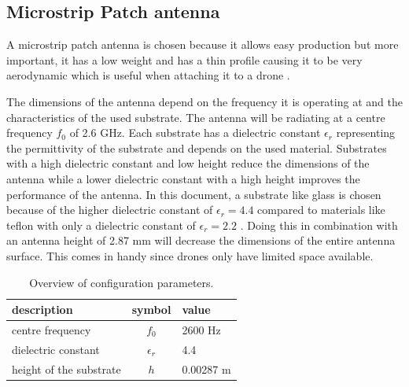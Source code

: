 \documentclass[twocolumn]{phdsymp} %
\begin{document}
\subsection{Microstrip Patch antenna}
A microstrip patch antenna is chosen because it allows easy production but more important, it has a low weight 
and has a thin profile causing it to be very aerodynamic which is useful when attaching it to a drone \cite{J13_microstripadvantages}.

The dimensions of the antenna depend on the frequency it is operating at and the characteristics of the used substrate.
The antenna will be radiating at a centre frequency $f_0$ of 2.6 GHz. Each substrate has a dielectric constant $\epsilon_r$ representing 
the permittivity of the substrate and depends on the used material.
Substrates with a high dielectric constant and low height 
reduce the dimensions of the antenna
while a lower dielectric constant with a high height improves the performance of the antenna. 
In this document, a substrate like glass 
is chosen because of the higher dielectric constant of $\epsilon_r = 4.4$ compared to materials like teflon with only a dielectric 
constant of $\epsilon_r = 2.2$ \cite{J14_antennadesign}. 
Doing this in combination with an antenna height of 2.87 mm will decrease the dimensions of the entire antenna surface.
This comes in handy since drones only have limited space available.

\begin{table}[h!]
\centering
\begin{tabular}{|l|c|l|}
\hline
 description            & symbol          & value         \\    \hline
 centre frequency       & $f_0$           & 2600 Hz       \\ 
 dielectric constant    & $\epsilon_r$    & 4.4         \\ 
 height of the substrate & $h$             & 0.00287 m    \\ \hline
\end{tabular}
\caption{Overview of configuration parameters.}
\label{table:antennaparas}
\end{table}
\end{document}
